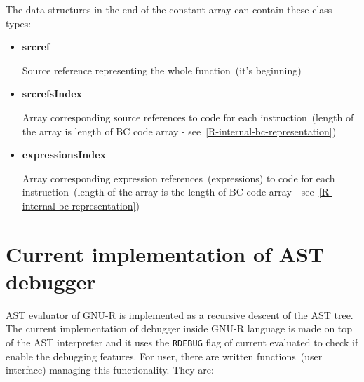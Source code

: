 \documentclass[thesis=M,english]{FITthesis}[2018/10/20]
\newcommand{\code}[1]{\texttt{#1}}
\begin{document}
The data structures in the end of the constant array can contain these class types:

\begin{itemize}
	\item \textbf{srcref}

Source reference representing the whole function~(it's beginning)

	\item \textbf{srcrefsIndex}

Array corresponding source references to code for each instruction~(length of the array is length of BC code array - see~\ref{R-internal-bc-representation})

	\item \textbf{expressionsIndex}

Array corresponding expression references~(expressions) to code for each instruction~(length of the array is the length of BC code array - see~\ref{R-internal-bc-representation})

\end{itemize}

\section{Current implementation of AST debugger}\label{AST-debugger}

AST evaluator of GNU-R is implemented as a recursive descent of the AST tree.
The current implementation of debugger inside  GNU-R language is made on top of the AST interpreter and it uses the \code{RDEBUG} flag of current evaluated to check if enable the debugging features. For user, there are written functions~(user interface) managing this functionality. They are:
\end{document}
